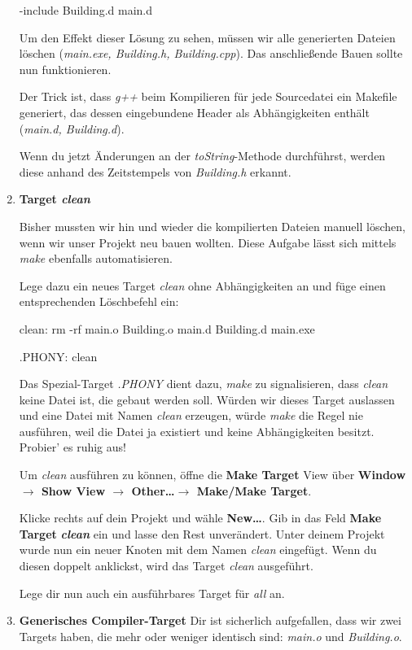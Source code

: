 \documentclass[
  accentcolor=tud1c,	%
  colorbacktitle,		%
  inverttitle,			%
  german,				%
  twoside
]{tudexercise}
\begin{document}
\begin{enumerate}
\begin{lstmake}
-include Building.d main.d
\end{lstmake}

Um den Effekt dieser Lösung zu sehen, müssen wir alle generierten Dateien löschen (\emph{main.exe, Building.h, Building.cpp}).
Das anschließende Bauen sollte nun funktionieren.

Der Trick ist, dass \emph{g++} beim Kompilieren für jede Sourcedatei ein Makefile generiert, das dessen eingebundene Header als Abhängigkeiten enthält (\emph{main.d, Building.d}).

Wenn du jetzt Änderungen an der \emph{toString}-Methode durchführst, werden diese anhand des Zeitstempels von \emph{Building.h} erkannt.




\item\textbf{Target \emph{clean}}

Bisher mussten wir hin und wieder die kompilierten Dateien manuell löschen, wenn wir unser Projekt neu bauen wollten.
Diese Aufgabe lässt sich mittels \emph{make} ebenfalls automatisieren.

Lege dazu ein neues Target \emph{clean} ohne Abhängigkeiten an und füge einen entsprechenden Löschbefehl ein:
\begin{lstmake}
clean:
	rm -rf main.o Building.o main.d Building.d main.exe

.PHONY: clean
\end{lstmake}
Das Spezial-Target \emph{.PHONY} dient dazu, \emph{make} zu signalisieren, dass \emph{clean} keine Datei ist, die gebaut werden soll.
Würden wir dieses Target auslassen und eine Datei mit Namen \emph{clean} erzeugen, würde \emph{make} die Regel nie ausführen, weil die Datei ja existiert und keine Abhängigkeiten besitzt.
Probier' es ruhig aus!

Um \emph{clean} ausführen zu können, öffne die \textbf{Make Target} View über \textbf{Window $\to$ Show View $\to$ Other\dots $\to$ Make/Make Target}.

Klicke rechts auf dein Projekt und wähle \textbf{New\dots}.
Gib in das Feld \textbf{Make Target} \textbf{\emph{clean}} ein und lasse den Rest unverändert.
Unter deinem Projekt wurde nun ein neuer Knoten mit dem Namen \emph{clean} eingefügt.
Wenn du diesen doppelt anklickst, wird das Target \emph{clean} ausgeführt.

Lege dir nun auch ein ausführbares Target für \emph{all} an.





\item\textbf{Generisches Compiler-Target}
Dir ist sicherlich aufgefallen, dass wir zwei Targets haben, die mehr oder weniger identisch sind: \emph{main.o} und \emph{Building.o}.


\end{enumerate}
\end{document}
